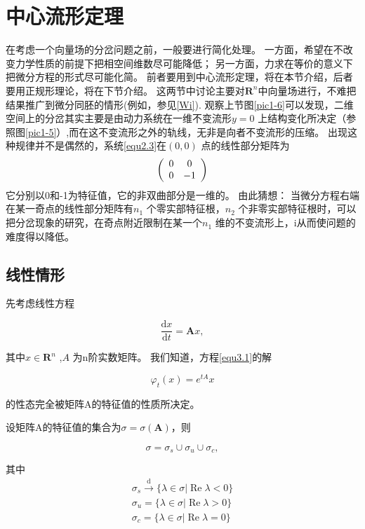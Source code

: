 \section{中心流形定理}
在考虑一个向量场的分岔问题之前，一般要进行简化处理。
一方面，希望在不改变力学性质的前提下把相空间维数尽可能降低；
另一方面，力求在等价的意义下把微分方程的形式尽可能化简。
前者要用到中心流形定理，将在本节介绍，后者要用正规形理论，将在下节介绍。
这两节中讨论主要对$\mathbf { R } ^ { n }$中向量场进行，不难把结果推广到微分同胚的情形(例如，参见\ref{Wi}).
观察上节图\ref{pic1-6}可以发现，二维空间上的分岔其实主要是由动力系统在一维不变流形\(y=0\) 上结构变化所决定（参照图\ref{pic1-5}）,而在这不变流形之外的轨线，无非是向者不变流形的压缩。
出现这种规律并不是偶然的，系统\ref{equ2.3}在\((0,0)\) 点的线性部分矩阵为
\[
	\left(
	\begin{array} { c c }
			{ 0 } & { 0 }   \\
			{ 0 } & { - 1 }
		\end{array}
	\right)
\]
它分别以0和-1为特征值，它的非双曲部分是一维的。
由此猜想：
当微分方程右端在某一奇点的线性部分矩阵有\(n_1\) 个零实部特征根，\(n_2\) 个非零实部特征根时，可以把分岔现象的研究，在奇点附近限制在某一个\(n_1\) 维的不变流形上，i从而使问题的难度得以降低。

\subsection{线性情形}
先考虑线性方程

\begin{equation}
	\frac {\mathrm { d } x } { \mathrm { d } t } = \boldsymbol { A } x,
	\label{eq:1.3.1}
\end{equation}

其中\(x \in\mathbf{R} ^ { n }\) ,\(A\) 为n阶实数矩阵。
我们知道，方程\ref{equ3.1}的解

\begin{equation}
	\varphi _ { t } ( x ) = e ^ { tA} x
	\label{eq1.3.2}
\end{equation}

的性态完全被矩阵A的特征值的性质所决定。

设矩阵A的特征值的集合为$\sigma = \sigma ( \boldsymbol { A } )$，则

\[
	\sigma=\sigma_{s} \cup\sigma_ {u}\cup\sigma_{ c },
\]

其中
\begin{equation}
	\begin{aligned}
		\sigma _ { s } \stackrel { \mathrm { d } } { \longrightarrow } \{ \lambda \in \sigma | \operatorname { Re } \lambda < 0 \} \\
		\sigma _ { u } = \{ \lambda \in \sigma | \operatorname { Re } \lambda > 0 \}                                               \\
		\sigma _ { c } = \{ \lambda \in \sigma | \operatorname { Re } \lambda = 0 \}
	\end{aligned}
	\label{eq:1.3.3}
\end{equation}

